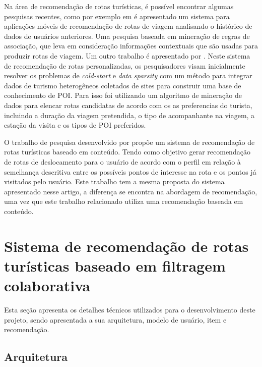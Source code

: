 \documentclass[portuguese]{textolivre}
\begin{document}
Na área de recomendação de rotas turísticas, é possível encontrar algumas pesquisas recentes, como por exemplo em \textcite{10.1145/1871437.1871513} é apresentado um sistema para aplicações móveis de recomendação de rotas de viagem analisando o histórico de dados de usuários anteriores. Uma pesquisa baseada em mineração de regras de associação, que leva em consideração informações contextuais que são usadas para produzir rotas de viagem. Um outro trabalho é apresentado por \textcite{bin2019personalized}. Neste sistema de recomendação de rotas personalizadas, os pesquisadores visam inicialmente resolver os problemas de \textit{cold-start} e \textit{data sparsity} com um método para integrar dados de turismo heterogêneos coletados de sites para construir uma base de conhecimento de POI. Para isso foi utilizando um algoritmo de mineração de dados para elencar rotas candidatas de acordo com os as preferencias do turista, incluindo a duração da viagem pretendida, o tipo de acompanhante na viagem, a estação da visita e os tipos de POI preferidos. 

O trabalho de pesquisa desenvolvido por \textcite{Barbosa2022} propõe um sistema de recomendação de rotas turísticas baseado em conteúdo. Tendo como objetivo gerar recomendação de rotas de deslocamento para o usuário de acordo com o perfil em relação à semelhança descritiva entre os possíveis pontos de interesse na rota e os pontos já visitados pelo usuário. Este trabalho tem a mesma proposta do sistema apresentado nesse artigo, a diferença se encontra na abordagem de recomendação, uma vez que este trabalho relacionado utiliza uma recomendação baseada em conteúdo.  


\section{Sistema de recomendação de rotas turísticas baseado em filtragem colaborativa}\label{sec_5}

Esta seção apresenta os detalhes técnicos utilizados para o desenvolvimento deste projeto, sendo apresentada a sua arquitetura, modelo de usuário, item e recomendação.

\subsection{Arquitetura}
\end{document}
